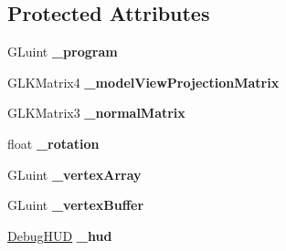 \subsection*{Protected Attributes}
\begin{DoxyCompactItemize}
\item 
\mbox{\label{category_game_view_controller_07_08_aaf195ab1d342341a88ca3d4bb47d5134}} 
G\+Luint {\bfseries \+\_\+program}
\item 
\mbox{\label{category_game_view_controller_07_08_afc4fc1314206c1e92d45a8ec848c0b3b}} 
G\+L\+K\+Matrix4 {\bfseries \+\_\+model\+View\+Projection\+Matrix}
\item 
\mbox{\label{category_game_view_controller_07_08_a87988e8a48e8173b6ea83ffb39183e05}} 
G\+L\+K\+Matrix3 {\bfseries \+\_\+normal\+Matrix}
\item 
\mbox{\label{category_game_view_controller_07_08_aace8109299beb90fbd3d5239fc8bb604}} 
float {\bfseries \+\_\+rotation}
\item 
\mbox{\label{category_game_view_controller_07_08_accbd211cbed0fe9177f19793ace01a41}} 
G\+Luint {\bfseries \+\_\+vertex\+Array}
\item 
\mbox{\label{category_game_view_controller_07_08_a4973311ad9ad111d5360ef8eb19cd1b8}} 
G\+Luint {\bfseries \+\_\+vertex\+Buffer}
\item 
\mbox{\label{category_game_view_controller_07_08_a157f30133b3868b55c452dc2ed351acf}} 
\hyperlink{struct_debug_h_u_d}{Debug\+H\+UD} {\bfseries \+\_\+hud}
\end{DoxyCompactItemize}
